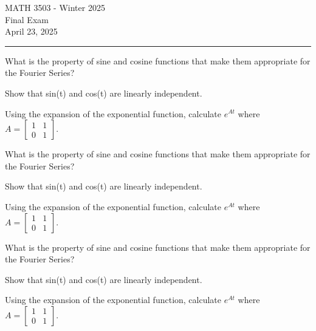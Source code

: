 \documentclass[12pt,letterpaper, onecolumn]{exam}
\begin{document}
\begingroup  
    \centering
    \LARGE MATH 3503 - Winter 2025\\
    \LARGE Final Exam\\[0.5em]
    \large April 23, 2025\\[0.5em]
\endgroup
\rule{\textwidth}{0.4pt}
\pointsdroppedatright   %
\printanswers
\renewcommand{\solutiontitle}{\noindent\textbf{Ans:}\enspace}   %

\begin{questions}
    
\thispagestyle{empty}   %
    
    \question[3 Marks] What is the property of sine and cosine functions that make them appropriate for the Fourier Series?\droppoints

    \question[3 Marks] Show that sin(t) and cos(t) are linearly independent.\droppoints
    
    \question[4 Marks] Using the expansion of the exponential function, calculate $e^{At}$ where $A = \begin{bmatrix} 1 & 1 \\ 0 & 1\end{bmatrix}$.\droppoints
    
    \question[3 Marks] What is the property of sine and cosine functions that make them appropriate for the Fourier Series?\droppoints

    \question[3 Marks] Show that sin(t) and cos(t) are linearly independent.\droppoints
    
    \question[4 Marks] Using the expansion of the exponential function, calculate $e^{At}$ where $A = \begin{bmatrix} 1 & 1 \\ 0 & 1\end{bmatrix}$.\droppoints
    
    \question[3 Marks] What is the property of sine and cosine functions that make them appropriate for the Fourier Series?\droppoints

    \question[3 Marks] Show that sin(t) and cos(t) are linearly independent.\droppoints
    
    \question[4 Marks] Using the expansion of the exponential function, calculate $e^{At}$ where $A = \begin{bmatrix} 1 & 1 \\ 0 & 1\end{bmatrix}$.\droppoints
    

\end{questions}
\end{document}
